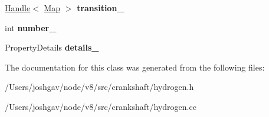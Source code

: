 \begin{DoxyCompactItemize}
\item 
\hyperlink{classv8_1_1internal_1_1_handle}{Handle}$<$ \hyperlink{classv8_1_1internal_1_1_map}{Map} $>$ {\bfseries transition\+\_\+}\hypertarget{classv8_1_1internal_1_1_h_optimized_graph_builder_1_1_property_access_info_ae10cb57fd6f9a07ff255487d5a7c573b}{}\label{classv8_1_1internal_1_1_h_optimized_graph_builder_1_1_property_access_info_ae10cb57fd6f9a07ff255487d5a7c573b}

\item 
int {\bfseries number\+\_\+}\hypertarget{classv8_1_1internal_1_1_h_optimized_graph_builder_1_1_property_access_info_a7e52956e4c38b1da656d38fa300c0544}{}\label{classv8_1_1internal_1_1_h_optimized_graph_builder_1_1_property_access_info_a7e52956e4c38b1da656d38fa300c0544}

\item 
Property\+Details {\bfseries details\+\_\+}\hypertarget{classv8_1_1internal_1_1_h_optimized_graph_builder_1_1_property_access_info_af0755b142aac06619a53e138d0011295}{}\label{classv8_1_1internal_1_1_h_optimized_graph_builder_1_1_property_access_info_af0755b142aac06619a53e138d0011295}

\end{DoxyCompactItemize}


The documentation for this class was generated from the following files\+:\begin{DoxyCompactItemize}
\item 
/\+Users/joshgav/node/v8/src/crankshaft/hydrogen.\+h\item 
/\+Users/joshgav/node/v8/src/crankshaft/hydrogen.\+cc\end{DoxyCompactItemize}
